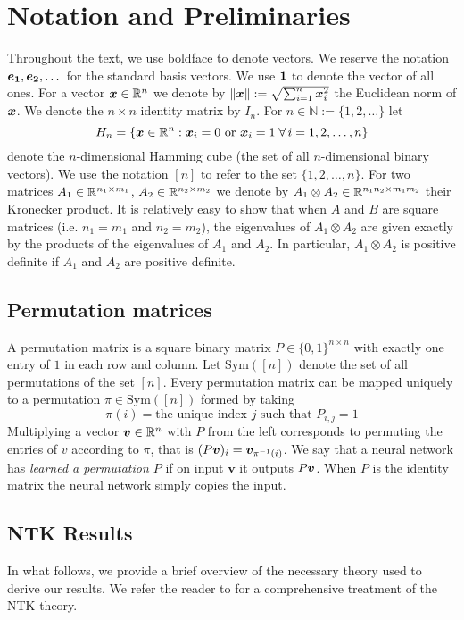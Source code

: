 \section{Notation and Preliminaries}
\label{sec:prelim}
Throughout the text, we use boldface to denote vectors. We reserve the notation $\boldsymbol{e_1}, \boldsymbol{e_2}, \dots$ for the standard basis vectors. We use $\boldsymbol{1}$ to denote the vector of all ones.  For a vector $\boldsymbol{x}\in \mathbb{R}^n$ we denote by $\|\boldsymbol{x}\| := \sqrt{\sum_{i=1}^n \boldsymbol{x}_i^2}$ the Euclidean norm of $\boldsymbol{x}$. We denote the $n\times n$ identity matrix by $I_n$. For $n \in \mathbb{N} := \{1,2,\dots\}$ let 
$$H_n=\{\boldsymbol{x} \in \mathbb{R}^n : \boldsymbol{x}_i =0 \text{ or } \boldsymbol{x}_i = 1 \;\forall\, i=1,2,\dots,n\}$$
denote the $n$-dimensional Hamming cube (the set of all $n$-dimensional binary vectors). We use the notation $[n]$ to refer to the set $\{1,2,\dots,n\}$. For two matrices $A_1 \in \mathbb{R}^{n_1 \times m_1}$, $A_2 \in \mathbb{R}^{n_2 \times m_2}$ we denote by $A_1 \otimes A_2 \in \mathbb{R}^{n_1n_2 \times m_1m_2}$ their Kronecker product. It is relatively easy to show that when $A$ and $B$ are square matrices (i.e. $n_1=m_1$ and $n_2=m_2$), the eigenvalues of $A_1 \otimes A_2$ are given exactly by the products of the eigenvalues of $A_1$ and $A_2$. In particular, $A_1 \otimes A_2$ is positive definite if $A_1$ and $A_2$ are positive definite.
\subsection{Permutation matrices}
\label{subsub:perm}
A permutation matrix is a square binary matrix $P \in \{0,1\}^{n\times n}$ with exactly one entry of $1$ in each row and column. Let $\text{Sym}([n])$ denote the set of all permutations of the set $[n]$. Every permutation matrix can be mapped uniquely to a permutation $\pi \in \text{Sym}([n])$ formed by taking $$\pi(i) = \text{the unique index } j \text{ such that } P_{i,j}=1$$
Multiplying a vector $\boldsymbol{v}\in \mathbb{R}^n$ with $P$ from the left corresponds to permuting the entries of $v$ according to $\pi$, that is $(P\boldsymbol{v})_i = \boldsymbol{v}_{\pi^{-1}(i)}$. We say that a neural network has \textit{learned a permutation $P$} if on input $\mathbf{v}$ it outputs $P\boldsymbol{v}$. When $P$ is the identity matrix the neural network simply copies the input.

\subsection{NTK Results}
In what follows, we provide a brief overview of the necessary theory used to derive our results.  We refer the reader to \cite{golikov2022neuraltangentkernelsurvey} for a comprehensive treatment of the NTK theory.
